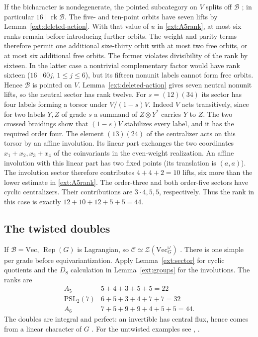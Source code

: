 \documentclass[11pt]{amsart}
\numberwithin{equation}{section}
\theoremstyle{definition}
\theoremstyle{plain}
\newcommand{\C}{\mathcal C}
\begin{document}
If the bicharacter is nondegenerate, the pointed subcategory on $V$
splits off $\mathcal B$ \cite[Theorem~3.13]{DGNO}; in particular
$16\mid\operatorname{rk}\mathcal B$. The five- and ten-point orbits have seven lifts by
Lemma~\ref{ext:deleted-action}. With that value of $u$ in
\eqref{ext:A5rank}, at most six ranks remain before introducing further
orbits. The weight and parity terms therefore permit one additional
size-thirty orbit with at most two free orbits, or at most six
additional free orbits. The former violates
divisibility of the rank by sixteen. In the latter case a nontrivial
complementary factor would have rank sixteen ($16\mid60j$,
$1\le j\le6$), but its
fifteen nonunit labels cannot form free orbits. Hence $\mathcal B$ is pointed on $V$. Lemma~\ref{ext:deleted-action}
gives seven neutral nonunit lifts, so the neutral sector has rank twelve. For $s=(12)(34)$ its sector has
four labels forming a torsor under $V/(1-s)V$. Indeed $V$ acts
transitively, since for two labels $Y,Z$ of grade $s$ a summand of
$Z\otimes Y^*$ carries $Y$ to $Z$. The two crossed braidings show
that $(1-s)V$ stabilizes every label, and it has the required order
four. The element $(13)(24)$ of the centralizer acts on this torsor
by an affine involution. Its linear part exchanges the two coordinates
$x_1+x_2,x_3+x_4$ of the coinvariants in the even-weight realization.
An affine involution with this linear part has two fixed points
(its translation is $(a,a)$). The involution sector therefore
contributes $4+4+2=10$ lifts, six more than the lower estimate in
\eqref{ext:A5rank}. The order-three and both order-five sectors have cyclic centralizers.
Their contributions are $3\cdot4,5,5$, respectively. Thus the rank
in this case is exactly $12+10+12+5+5=44$.


\subsection{The twisted doubles}
If $\mathcal B=\mathrm{Vec}$, $\operatorname{Rep}(G)$ is Lagrangian, so
$\C\simeq\mathcal Z(\mathrm{Vec}_G^\omega)$
\cite[Proposition~4.58 and Theorem~4.66]{DGNO}.
There is one simple per grade before equivariantization. Apply
Lemma~\ref{ext:sector} for cyclic quotients and the $D_8$ calculation
in Lemma~\ref{ext:groups} for the involutions. The ranks are
\[
\begin{array}{c|l}
A_5&5+4+3+5+5=22\\
\mathrm{PSL}_2(7)&6+5+3+4+7+7=32\\
A_6&7+5+9+9+4+5+5=44 .
\end{array}
\]
The doubles are integral and perfect: an invertible has central flux,
hence comes from a linear character of $G$ \cite[Theorem~2.1]{GruenMorrison}.
For the untwisted examples see \cite[discussion before Question~11.8]{BPBurnside},
\cite[\S4.2.5]{CZ}.
\end{document}
